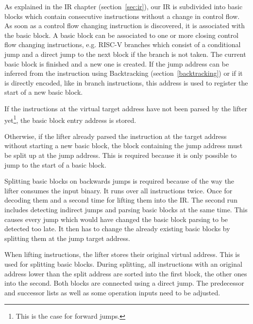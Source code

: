 \documentclass[course=eragp]{aspdoc}
\begin{document}
\par

As explained in the IR chapter (section~\ref{sec:ir}), our IR is subdivided into basic blocks which contain
consecutive instructions without a change in control flow. As soon as a control flow changing
instruction is discovered, it is associated with the basic block. A basic block can be
associated to one or more closing control flow changing
instructions, e.g. RISC-V branches which consist of a conditional
jump and a direct jump to the next block if the branch is not taken. The current basic block is finished and
a new one is created. If the jump address can be inferred from the instruction using
Backtracking (section~\ref{backtracking}) or if it is directly encoded, like in branch instructions, this address is used
to register the start of a new basic block.

\par

If the instructions at the virtual target address have not been parsed by the lifter
yet\footnote{This is the case for forward jumps.}, the basic block entry address is stored.

Otherwise, if the lifter already parsed the instruction at the target address without starting a new
basic block, the block containing the jump address must be split up at the jump address.
This is required because it is only possible to jump to the start of a basic block.

\par

Splitting basic blocks on backwards jumps is required because of the way the lifter consumes the
input binary. It
runs over all instructions twice. Once for decoding them and a second time for lifting them into the
IR. The second run includes detecting indirect jumps and parsing basic blocks at the same time. This
causes every jump which would have changed the basic block parsing to be detected too late. It then has to
change the already existing basic blocks by splitting them at the jump target address.

\par

When lifting instructions, the lifter stores their original virtual address. This is used for
splitting basic blocks. During splitting, all instructions with an original address lower than the split address are
sorted into the first block, the other ones into the second. Both blocks are connected using a
direct jump. The predecessor and successor lists as well as some operation inputs need to be
adjusted.
\end{document}
